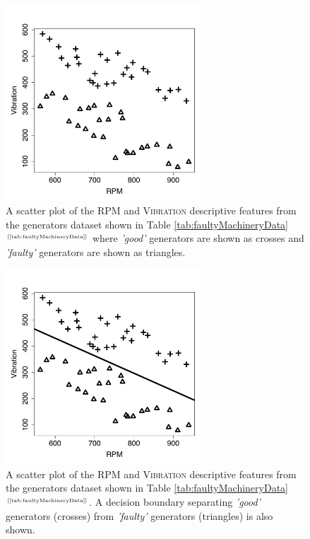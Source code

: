 \documentclass[xcolor={table}]{beamer}
\newcommand{\featN}[1]{\textsc{#1}}
\newcommand{\featL}[1]{\textit{'#1'}}
\newcommand{\ourRef}[1]{\ref{#1} $^{\text{\tiny[\pageref{#1}]}}$}
\begin{document}
 \begin{frame} [plain]
\begin{figure}[htb]
\begin{center}
\includegraphics[width=0.65\textwidth]{./images/gradientDescentLogisticClassificationDemoGoodSepNonNormDataset.pdf}
\caption{A scatter plot of the \featN{RPM} and \featN{Vibration} descriptive features from the generators dataset shown in Table \ourRef{tab:faultyMachineryData} where \featL{good} generators are shown as crosses and \featL{faulty} generators are shown as triangles.}
\label{fig:faultyMachinesData}
\end{center}
\end{figure}		
\end{frame} 

 \begin{frame}[plain]
\begin{figure}[htb]
\begin{center}
\includegraphics[width=0.65\textwidth]{./images/gradientDescentLogisticClassificationGoodSepNonNormDemoFinal.pdf}
\caption{A scatter plot of the \featN{RPM} and \featN{Vibration} descriptive features from the generators dataset shown in Table \ourRef{tab:faultyMachineryData}. A decision boundary separating \featL{good} generators (crosses) from \featL{faulty} generators (triangles) is also shown.}
\label{fig:faultyMachinesDataLinearSep}
\end{center}
\end{figure}
\end{frame} 
\end{document}

